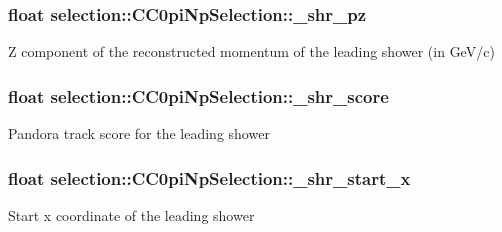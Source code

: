 \subsubsection[{\texorpdfstring{\+\_\+shr\+\_\+pz}{_shr_pz}}]{\setlength{\rightskip}{0pt plus 5cm}float selection\+::\+C\+C0pi\+Np\+Selection\+::\+\_\+shr\+\_\+pz\hspace{0.3cm}{\ttfamily [private]}}\hypertarget{classselection_1_1CC0piNpSelection_a769319ad32b6ce49c7a5283b246303fa}{}\label{classselection_1_1CC0piNpSelection_a769319ad32b6ce49c7a5283b246303fa}
Z component of the reconstructed momentum of the leading shower (in Ge\+V/c) 
\subsubsection[{\texorpdfstring{\+\_\+shr\+\_\+score}{_shr_score}}]{\setlength{\rightskip}{0pt plus 5cm}float selection\+::\+C\+C0pi\+Np\+Selection\+::\+\_\+shr\+\_\+score\hspace{0.3cm}{\ttfamily [private]}}\hypertarget{classselection_1_1CC0piNpSelection_a9033ad097ef1b7a4e10b2b872b82f068}{}\label{classselection_1_1CC0piNpSelection_a9033ad097ef1b7a4e10b2b872b82f068}
Pandora track score for the leading shower 
\subsubsection[{\texorpdfstring{\+\_\+shr\+\_\+start\+\_\+x}{_shr_start_x}}]{\setlength{\rightskip}{0pt plus 5cm}float selection\+::\+C\+C0pi\+Np\+Selection\+::\+\_\+shr\+\_\+start\+\_\+x\hspace{0.3cm}{\ttfamily [private]}}\hypertarget{classselection_1_1CC0piNpSelection_ac0fb4dbd656f2f3fb2c12ffc02a0df7c}{}\label{classselection_1_1CC0piNpSelection_ac0fb4dbd656f2f3fb2c12ffc02a0df7c}
Start x coordinate of the leading shower 
